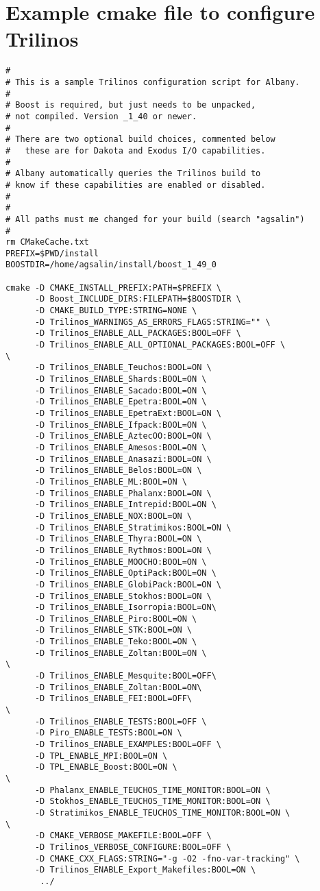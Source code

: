 \documentclass[pdf,12pt,report,strict]{SANDreport}
\theoremstyle{remark}
\begin{document}
\section{Example cmake file to configure Trilinos}
\begin{verbatim}
#
# This is a sample Trilinos configuration script for Albany.
#
# Boost is required, but just needs to be unpacked,
# not compiled. Version _1_40 or newer.
#
# There are two optional build choices, commented below
#   these are for Dakota and Exodus I/O capabilities.
#
# Albany automatically queries the Trilinos build to 
# know if these capabilities are enabled or disabled.
#
#
# All paths must me changed for your build (search "agsalin")
#
rm CMakeCache.txt
PREFIX=$PWD/install
BOOSTDIR=/home/agsalin/install/boost_1_49_0

cmake -D CMAKE_INSTALL_PREFIX:PATH=$PREFIX \
      -D Boost_INCLUDE_DIRS:FILEPATH=$BOOSTDIR \
      -D CMAKE_BUILD_TYPE:STRING=NONE \
      -D Trilinos_WARNINGS_AS_ERRORS_FLAGS:STRING="" \
      -D Trilinos_ENABLE_ALL_PACKAGES:BOOL=OFF \
      -D Trilinos_ENABLE_ALL_OPTIONAL_PACKAGES:BOOL=OFF \
\
      -D Trilinos_ENABLE_Teuchos:BOOL=ON \
      -D Trilinos_ENABLE_Shards:BOOL=ON \
      -D Trilinos_ENABLE_Sacado:BOOL=ON \
      -D Trilinos_ENABLE_Epetra:BOOL=ON \
      -D Trilinos_ENABLE_EpetraExt:BOOL=ON \
      -D Trilinos_ENABLE_Ifpack:BOOL=ON \
      -D Trilinos_ENABLE_AztecOO:BOOL=ON \
      -D Trilinos_ENABLE_Amesos:BOOL=ON \
      -D Trilinos_ENABLE_Anasazi:BOOL=ON \
      -D Trilinos_ENABLE_Belos:BOOL=ON \
      -D Trilinos_ENABLE_ML:BOOL=ON \
      -D Trilinos_ENABLE_Phalanx:BOOL=ON \
      -D Trilinos_ENABLE_Intrepid:BOOL=ON \
      -D Trilinos_ENABLE_NOX:BOOL=ON \
      -D Trilinos_ENABLE_Stratimikos:BOOL=ON \
      -D Trilinos_ENABLE_Thyra:BOOL=ON \
      -D Trilinos_ENABLE_Rythmos:BOOL=ON \
      -D Trilinos_ENABLE_MOOCHO:BOOL=ON \
      -D Trilinos_ENABLE_OptiPack:BOOL=ON \
      -D Trilinos_ENABLE_GlobiPack:BOOL=ON \
      -D Trilinos_ENABLE_Stokhos:BOOL=ON \
      -D Trilinos_ENABLE_Isorropia:BOOL=ON\
      -D Trilinos_ENABLE_Piro:BOOL=ON \
      -D Trilinos_ENABLE_STK:BOOL=ON \
      -D Trilinos_ENABLE_Teko:BOOL=ON \
      -D Trilinos_ENABLE_Zoltan:BOOL=ON \
\
      -D Trilinos_ENABLE_Mesquite:BOOL=OFF\
      -D Trilinos_ENABLE_Zoltan:BOOL=ON\
      -D Trilinos_ENABLE_FEI:BOOL=OFF\
\
      -D Trilinos_ENABLE_TESTS:BOOL=OFF \
      -D Piro_ENABLE_TESTS:BOOL=ON \
      -D Trilinos_ENABLE_EXAMPLES:BOOL=OFF \
      -D TPL_ENABLE_MPI:BOOL=ON \
      -D TPL_ENABLE_Boost:BOOL=ON \
\
      -D Phalanx_ENABLE_TEUCHOS_TIME_MONITOR:BOOL=ON \
      -D Stokhos_ENABLE_TEUCHOS_TIME_MONITOR:BOOL=ON \
      -D Stratimikos_ENABLE_TEUCHOS_TIME_MONITOR:BOOL=ON \
\
      -D CMAKE_VERBOSE_MAKEFILE:BOOL=OFF \
      -D Trilinos_VERBOSE_CONFIGURE:BOOL=OFF \
      -D CMAKE_CXX_FLAGS:STRING="-g -O2 -fno-var-tracking" \
      -D Trilinos_ENABLE_Export_Makefiles:BOOL=ON \
       ../


\end{verbatim}
\end{document}
